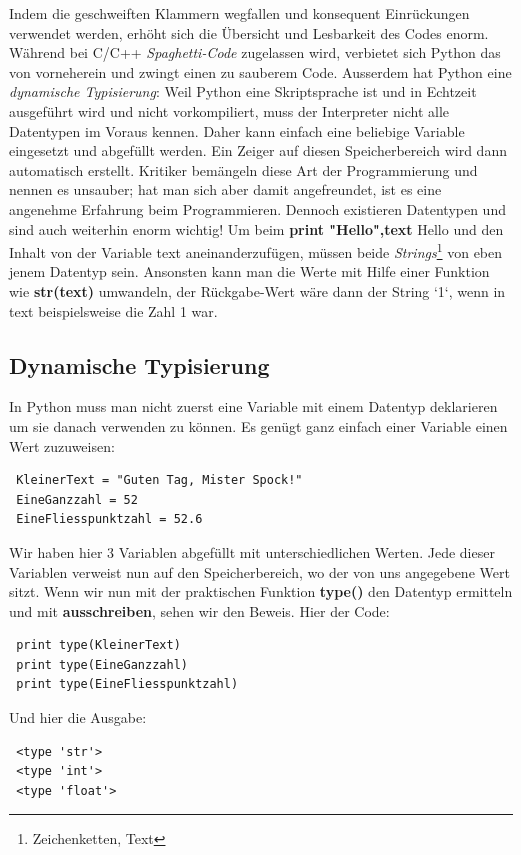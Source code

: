 \documentclass[b5paper,10pt,dvips,fleqn,titlepage,twoside]{book}
\begin{document}
Indem die geschweiften Klammern wegfallen und konsequent Einrückungen verwendet werden, erhöht sich die Übersicht und Lesbarkeit des Codes enorm. Während bei C/C++ \emph{Spaghetti-Code} zugelassen wird, verbietet sich Python das von vorneherein und zwingt einen zu sauberem Code.\newline
Ausserdem hat Python eine \emph{dynamische Typisierung}: Weil Python eine Skriptsprache ist und in Echtzeit ausgeführt wird und nicht vorkompiliert, muss der Interpreter nicht alle Datentypen im Voraus kennen. Daher kann einfach eine beliebige Variable eingesetzt und abgefüllt werden. Ein Zeiger auf diesen Speicherbereich wird dann automatisch erstellt.\newline
Kritiker bemängeln diese Art der Programmierung und nennen es unsauber; hat man sich aber damit angefreundet, ist es eine angenehme Erfahrung beim Programmieren.\newline
Dennoch existieren Datentypen und sind auch weiterhin enorm wichtig! Um beim \textbf{print "Hello",text} Hello und den Inhalt von der Variable text aneinanderzufügen, müssen beide \emph{Strings}\footnote{Zeichenketten, Text} von eben jenem Datentyp sein. Ansonsten kann man die Werte mit Hilfe einer Funktion wie \textbf{str(text)} umwandeln, der Rückgabe-Wert wäre dann der String `1`, wenn in text beispielsweise die Zahl 1 war.
\subsection{Dynamische Typisierung}
In Python muss man nicht zuerst eine Variable mit einem Datentyp deklarieren um sie danach verwenden zu können.
Es genügt ganz einfach einer Variable einen Wert zuzuweisen:\newline
\begin{lstlisting}
 KleinerText = "Guten Tag, Mister Spock!"
 EineGanzzahl = 52
 EineFliesspunktzahl = 52.6
\end{lstlisting}
Wir haben hier 3 Variablen abgefüllt mit unterschiedlichen Werten. Jede dieser Variablen verweist nun auf den Speicherbereich, wo der von uns angegebene Wert sitzt.
Wenn wir nun mit der praktischen Funktion \textbf{type()} den Datentyp ermitteln und mit \textbf{ausschreiben}, sehen wir den Beweis.\newline
Hier der Code:
\begin{lstlisting}
 print type(KleinerText)
 print type(EineGanzzahl)
 print type(EineFliesspunktzahl)
\end{lstlisting}
Und hier die Ausgabe:
\begin{lstlisting}
 <type 'str'>
 <type 'int'>
 <type 'float'>
\end{lstlisting}
\end{document}
